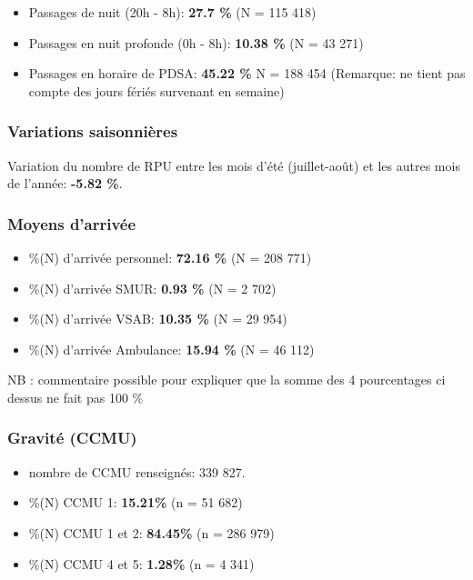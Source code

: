 \documentclass[]{article}
\begin{document}
\begin{itemize}
\item
  Passages de nuit (20h - 8h): \textbf{27.7 \%} (N = 115 418)
\item
  Passages en nuit profonde (0h - 8h): \textbf{10.38 \%} (N = 43 271)
\item
  Passages en horaire de PDSA: \textbf{45.22 \%} N = 188 454 (Remarque:
  ne tient pas compte des jours fériés survenant en semaine)
\end{itemize}

\subsubsection{Variations saisonnières}\label{variations-saisonnieres}

Variation du nombre de RPU entre les mois d'été (juillet-août) et les
autres mois de l'année: \textbf{-5.82 \%}.

\subsubsection{Moyens d'arrivée}\label{moyens-darrivee}

\begin{itemize}
\itemsep1pt\parskip0pt
\item
  \%(N) d'arrivée personnel: \textbf{72.16 \%} (N = 208 771)
\item
  \%(N) d'arrivée SMUR: \textbf{0.93 \%} (N = 2 702)
\item
  \%(N) d'arrivée VSAB: \textbf{10.35 \%} (N = 29 954)
\item
  \%(N) d'arrivée Ambulance: \textbf{15.94 \%} (N = 46 112)
\end{itemize}

NB : commentaire possible pour expliquer que la somme des 4 pourcentages
ci dessus ne fait pas 100 \%

\subsubsection{Gravité (CCMU)}\label{gravite-ccmu}

\begin{itemize}
\itemsep1pt\parskip0pt
\item
  nombre de CCMU renseignés: 339 827.
\item
  \%(N) CCMU 1: \textbf{15.21\%} (n = 51 682)
\item
  \%(N) CCMU 1 et 2: \textbf{84.45\%} (n = 286 979)
\item
  \%(N) CCMU 4 et 5: \textbf{1.28\%} (n = 4 341)
\end{itemize}
\end{document}
